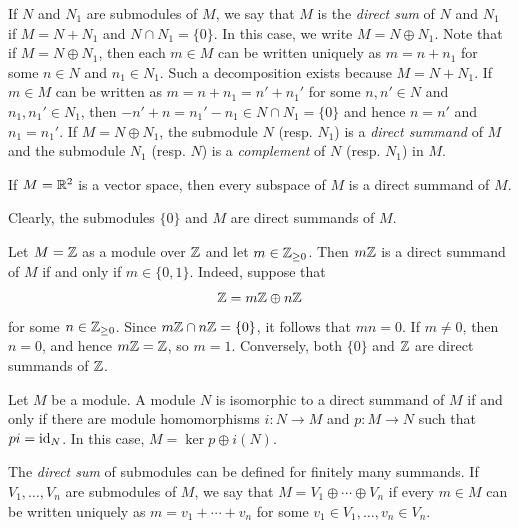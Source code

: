 If $N$ and $N_1$ are submodules of $M$, we say that $M$ is the \emph{direct
sum} of $N$ and $N_1$ if $M=N+N_1$ and $N\cap N_1=\{0\}$. In this case, we
write $M=N\oplus N_1$. Note that if $M=N\oplus N_1$, then each $m\in M$ can be
written uniquely as $m=n+n_1$ for some $n\in N$ and $n_1\in N_1$.  Such a
decomposition exists because $M=N+N_1$. If $m\in M$ can be written as
$m=n+n_1=n'+n_1'$ for some $n,n'\in N$ and $n_1,n_1'\in N_1$, then
$-n'+n=n_1'-n_1\in N\cap N_1=\{0\}$ and hence $n=n'$ and $n_1=n_1'$. If
$M=N\oplus N_1$, the submodule $N$ (resp. $N_1$) is a \emph{direct summand} of
$M$ and the submodule $N_1$ (resp. $N$) is a \emph{complement} of $N$ (resp. $N_1$) in $M$.   	

\begin{example}
If $M=\mathbb{R}^2$ is a vector space, then every subspace of $M$ is a direct summand of $M$.
\end{example}

Clearly, the submodules $\{0\}$ and $M$ are direct summands of $M$.

\begin{example}
Let $M=\mathbb{Z}$ as a module over $\mathbb{Z}$ and let $m\in\mathbb{Z}_{\geq0}$. Then
$m\mathbb{Z}$ is a direct summand of $M$ if and only if $m\in\{0,1\}$.
Indeed, suppose that
\[
\mathbb{Z}=m\mathbb{Z}\oplus n\mathbb{Z}
\]
for some $n\in\mathbb{Z}_{\geq0}$. Since
$m\mathbb{Z}\cap n\mathbb{Z}=\{0\}$, it follows that $mn=0$. If $m\ne0$, then
$n=0$, and hence $m\mathbb{Z}=\mathbb{Z}$, so $m=1$. Conversely, both $\{0\}$
and $\mathbb{Z}$ are direct summands of $\mathbb{Z}$.
\end{example}

\begin{exercise}
\label{xca:projector}
Let $M$ be a module. 
A module $N$ is isomorphic to a direct summand of $M$ if and only if
there are module homomorphisms $i\colon N\to M$ and $p\colon M\to N$ 
such that $pi=\operatorname{id}_N$. In this case, $M=\ker p\oplus i(N)$.  
\end{exercise}

The \emph{direct sum} of submodules can be defined for finitely many summands.
If $V_1,\dots,V_n$ are submodules of $M$, we say that $M=V_1\oplus\cdots\oplus
V_n$ if every $m\in M$ can be written uniquely as $m=v_1+\cdots+v_n$ for some
$v_1\in V_1,\dots,v_n\in V_n$. 

